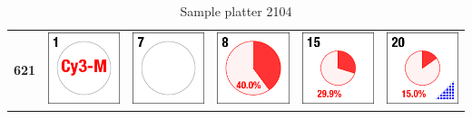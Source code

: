 \begin{table}
\begin{center}
\begin{tabular}{cccccc}
\textbf{621} & \includegraphics{./images/ace_m2_sample_tiles/sample01.png} & \includegraphics{./images/ace_m2_sample_tiles/sample07.png} & \includegraphics{./images/ace_m2_sample_tiles/sample08.png} & \includegraphics{./images/ace_m2_sample_tiles/sample15.png} & \includegraphics{./images/ace_m2_sample_tiles/sample20.png}\\
\end{tabular}
\caption{Sample platter 2104}
\end{center}
\end{table}


